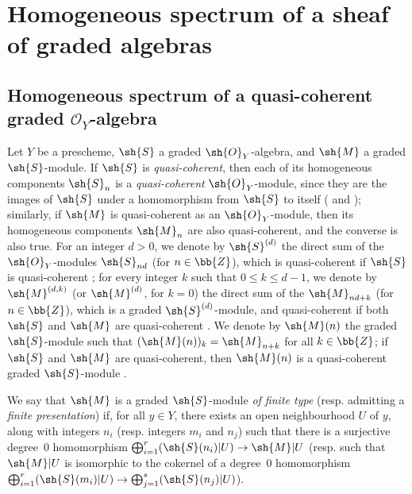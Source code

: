 \section{Homogeneous spectrum of a sheaf of graded algebras}
\label{section:II.3}


\subsection{Homogeneous spectrum of a quasi-coherent graded $\mathcal{O}_Y$-algebra}
\label{subsection:II.3.1}

\begin{env}[3.1.1]
\label{II.3.1.1}
Let $Y$ be a prescheme, $\sh{S}$ a graded $\sh{O}_Y$-algebra, and $\sh{M}$ a graded $\sh{S}$-module.
If $\sh{S}$ is \emph{quasi-coherent}, then each of its homogeneous components $\sh{S}_n$ is a \emph{quasi-coherent} $\sh{O}_Y$-module, since they are the images of $\sh{S}$ under a homomorphism from $\sh{S}$ to itself ( and );
similarly, if $\sh{M}$ is quasi-coherent as an $\sh{O}_Y$-module, then its homogeneous components $\sh{M}_n$ are also quasi-coherent, and the converse is also true.
For an integer $d>0$, we denote by $\sh{S}^{(d)}$ the direct sum of the $\sh{O}_Y$-modules $\sh{S}_{nd}$ (for $n\in\bb{Z}$), which is quasi-coherent if $\sh{S}$ is quasi-coherent ;
for every integer $k$ such that $0\leq k\leq d-1$, we denote by $\sh{M}^{(d,k)}$ (or $\sh{M}^{(d)}$, for $k=0$) the direct sum of the $\sh{M}_{nd+k}$ (for $n\in\bb{Z}$), which is a graded $\sh{S}^{(d)}$-module, and quasi-coherent if both $\sh{S}$ and $\sh{M}$ are quasi-coherent .
We denote by $\sh{M}(n)$ the graded $\sh{S}$-module such that $(\sh{M}(n))_k=\sh{M}_{n+k}$ for all $k\in\bb{Z}$;
if $\sh{S}$ and $\sh{M}$ are quasi-coherent, then $\sh{M}(n)$ is a quasi-coherent graded $\sh{S}$-module .

We say that $\sh{M}$ is a graded $\sh{S}$-module \emph{of finite type} (resp. admitting a \emph{finite presentation})  if, for all $y\in Y$, there exists an open neighbourhood $U$ of $y$, along with integers $n_i$ (resp. integers $m_i$ and $n_j$) such that there is a surjective degree~$0$ homomorphism $\bigoplus_{i=1}^r(\sh{S}(n_i)|U)\to\sh{M}|U$ (resp. such that $\sh{M}|U$ is isomorphic to the cokernel of a degree~$0$ homomorphism $\bigoplus_{i=1}^r(\sh{S}(m_i)|U)\to\bigoplus_{j=1}^s(\sh{S}(n_j)|U)$).


\end{env}
